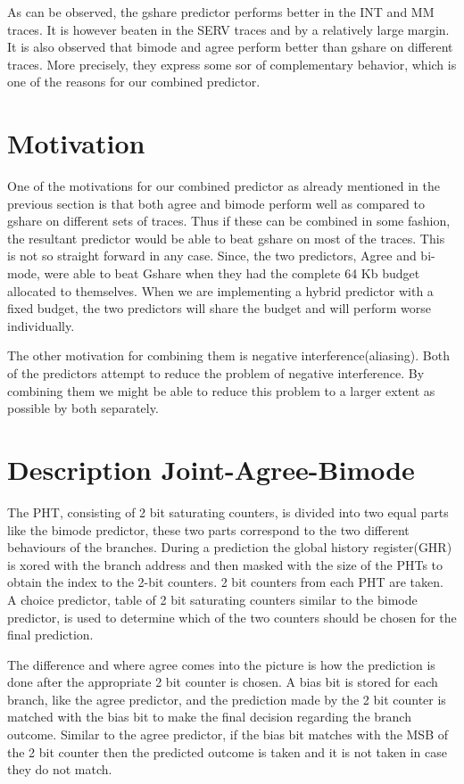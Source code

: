\documentclass{sig-alternate}
\begin{document}
As can be observed, the gshare predictor performs better in the INT and MM traces. It is however beaten in the SERV traces and by a relatively large margin. It is also observed that bimode and agree perform better than gshare on different traces. More precisely, they express some sor of complementary behavior, which is one of the reasons for our combined predictor.\par

\section{Motivation}
One of the motivations for our combined predictor as already mentioned in the previous section is that both agree and bimode perform well as compared to gshare on different sets of traces. Thus if these can be combined in some fashion, the resultant predictor would be able to beat gshare on most of the traces. This is not so straight forward in any case. Since, the two predictors, Agree and bi-mode, were able to beat Gshare when they had the complete 64 Kb budget allocated to themselves. When we are implementing a hybrid predictor with a fixed budget, the two predictors will share the budget and will perform worse individually. \par

The other motivation for combining them is negative interference(aliasing). Both of the predictors attempt to reduce the problem of negative interference. By combining them we might be able to reduce this problem to a larger extent as possible by both separately.

\section{Description Joint-Agree-Bimode}

The PHT, consisting of 2 bit saturating counters, is divided into two equal parts like the bimode predictor, these two parts correspond to the two different behaviours of the branches. During a prediction the global history register(GHR) is xored with the branch address and then masked with the size of the PHTs to obtain the index to the 2-bit counters. 2 bit counters from each PHT are taken. A choice predictor, table of 2 bit saturating counters similar to the bimode predictor, is used to determine which of the two counters should be chosen for the final prediction.

The difference and where agree comes into the picture is how the prediction is done after the appropriate 2 bit counter is chosen. A bias bit is stored for each branch, like the agree predictor, and the prediction made by the 2 bit counter is matched with the bias bit to make the final decision regarding the branch outcome. Similar to the agree predictor, if the bias bit matches with the MSB of the 2 bit counter then  the predicted outcome is taken and it is not taken in case they do not match.
\end{document}
